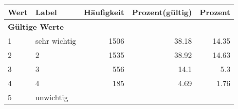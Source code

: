      \begin{longtable}{lXrrr}
     \toprule
     \textbf{Wert} & \textbf{Label} & \textbf{Häufigkeit} & \textbf{Prozent(gültig)} & \textbf{Prozent} \\
     \endhead
     \midrule
     \multicolumn{5}{l}{\textbf{Gültige Werte}}\\

     1 &
     \multicolumn{1}{X}{ sehr wichtig   } &


       \num{1506} &
       \num[round-mode=places,round-precision=2]{38.18} &
         \num[round-mode=places,round-precision=2]{14.35} \\

     2 &
     \multicolumn{1}{X}{ 2   } &


       \num{1535} &
       \num[round-mode=places,round-precision=2]{38.92} &
         \num[round-mode=places,round-precision=2]{14.63} \\

     3 &
     \multicolumn{1}{X}{ 3   } &


       \num{556} &
       \num[round-mode=places,round-precision=2]{14.1} &
         \num[round-mode=places,round-precision=2]{5.3} \\

     4 &
     \multicolumn{1}{X}{ 4   } &


       \num{185} &
       \num[round-mode=places,round-precision=2]{4.69} &
         \num[round-mode=places,round-precision=2]{1.76} \\

     5 &
     \multicolumn{1}{X}{ unwichtig   } &



\end{longtable}
